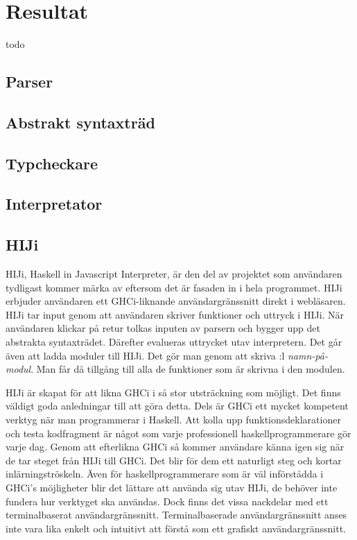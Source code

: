 \section{Resultat}
todo

\subsection{Parser} 

\subsection{Abstrakt syntaxträd} 

\subsection{Typcheckare} 

\subsection{Interpretator}


\subsection{HIJi}
HIJi, Haskell in Javascript Interpreter, är den del av projektet som användaren tydligast kommer märka av eftersom det är fasaden in i hela programmet.
HIJi erbjuder användaren ett GHCi-liknande användargränssnitt direkt i webläsaren. 
HIJi tar input genom att användaren skriver funktioner och uttryck i HIJi. När användaren klickar på retur tolkas inputen av parsern och bygger upp det abstrakta syntaxträdet. Därefter evalueras uttrycket utav interpretern.
Det går även att ladda moduler till HIJi. Det gör man genom att skriva :l \emph{namn-på-modul}. Man får då tillgång till alla de funktioner som är skrivna i den modulen. 

HIJi är skapat för att likna GHCi i så stor utsträckning som möjligt. Det finns väldigt goda anledningar till att göra detta. Dels är GHCi ett mycket kompetent verktyg när man programmerar i Haskell. Att kolla upp funktionsdeklarationer och testa kodfragment är något som varje professionell haskellprogrammerare gör varje dag. Genom att efterlikna GHCi så kommer användare känna igen sig när de tar steget från HIJi till GHCi. Det blir för dem ett naturligt steg och kortar inlärningströskeln. Även för haskellprogrammerare som är väl införstådda i GHCi's möjligheter blir det lättare att använda sig utav HIJi, de behöver inte fundera hur verktyget ska användas.
Dock finns det vissa nackdelar med ett terminalbaserat användargränssnitt. Terminalbaserade användargränssnitt anses inte vara lika enkelt och intuitivt att förstå som ett grafiskt användargränssnitt. 


